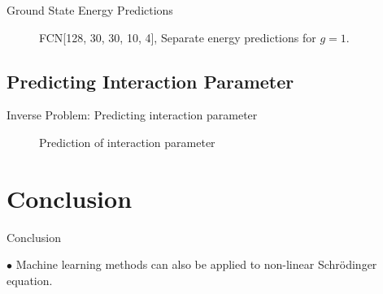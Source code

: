 \documentclass{beamer}
\begin{document}
\begin{frame}{Ground State Energy Predictions}

\begin{figure}[H]
    \centering
    \begin{subfigure}[t]{0.45\textwidth}
		\centering
        
		\label{fig:a}
    \end{subfigure}
    \begin{subfigure}[t]{0.45\textwidth}
		\centering
        
		\label{fig:b}
    \end{subfigure}    
    \begin{subfigure}[t]{0.45\textwidth}
        \centering
        
		\label{fig:c}
    \end{subfigure}
    \begin{subfigure}[t]{0.45\textwidth}
        \centering
        
		\label{fig:c}
    \end{subfigure}
	\caption{FCN[128, 30, 30, 10, 4], Separate energy predictions for $g = 1$.}
\label{fig:FFN-g-1-S}
\end{figure}
\end{frame}

\subsection{Predicting Interaction Parameter}
\begin{frame}{Inverse Problem: Predicting interaction parameter}

\begin{figure}[H]
    \centering
    \begin{subfigure}[t]{0.45\textwidth}
		\centering
    	
		\label{fig:a}
    \end{subfigure}
    \begin{subfigure}[t]{0.45\textwidth}
        \centering
    	
		\label{fig:b}
    \end{subfigure}
    \begin{subfigure}[t]{0.45\textwidth}
        \centering
		
		\label{fig:c}
    \end{subfigure}
    \begin{subfigure}[t]{0.45\textwidth}
        \centering
		
		\label{fig:d}
	    \end{subfigure}
	\caption{Prediction of interaction parameter}
\end{figure}
\end{frame}

\section{Conclusion}
\begin{frame}{Conclusion}

$\bullet$ Machine learning methods can also be applied to non-linear
Schrödinger equation.

\vskip 1cm

\end{frame}
\end{document}

